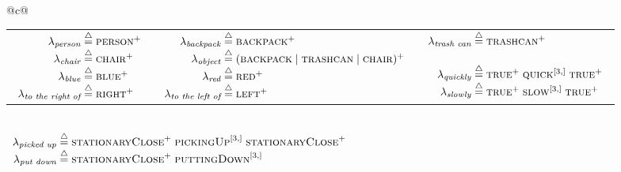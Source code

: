 \begin{table}
{\begin{tabular}{@{}c@{}}
\begin{tabular}{@{}c@{}c@{\hspace{-20ex}}c@{}}
\begin{math}
          \begin{array}[t]{r@{\;\define\;}l}
          \lambda_{\textit{person}} & \textsc{person}\plus\\
          \lambda_{\textit{chair}} & \textsc{chair}\plus\\
          \lambda_{\textit{blue}} & \textsc{blue}\plus\\
          \lambda_{\textit{to the right of}} & \textsc{right}\plus
          \end{array}
        \end{math}&
        \begin{math}
          \begin{array}[t]{r@{\;\define\;}l}
          \lambda_{\textit{backpack}} & \textsc{backpack}\plus\\
          \lambda_{\textit{object}} &
          (\textsc{backpack}\;|\;\textsc{trashcan}\;|\;\textsc{chair})
          \plus\\
          \lambda_{\textit{red}} & \textsc{red}\plus\\
          \lambda_{\textit{to the left of}} & \textsc{left}\plus
          \end{array}
        \end{math}&
        \begin{math}
          \begin{array}[t]{r@{\;}c@{\;}l}
          \lambda_{\textit{trash can}} & \define & \textsc{trashcan} \plus\\
          \\[0.5ex]             %
          \lambda_{\textit{quickly}} & \define &
          \textsc{true}\plus\;\textsc{quick}\dagr\;\textsc{true}\plus\\
          \lambda_{\textit{slowly}} & \define &
          \textsc{true}\plus\;\textsc{slow}\dagr\;\textsc{true}\plus
          \end{array}
        \end{math}
      \end{tabular}\\
      \begin{math}
        \begin{array}[t]{r@{\;\define\;}l}
          \lambda_{\textit{picked up}} &
          \textsc{stationaryClose}\plus\;
          \textsc{pickingUp}\dagr\;
          \textsc{stationaryClose}\plus\\
          \lambda_{\textit{put down}} &
          \textsc{stationaryClose}\plus\;
          \textsc{puttingDown}\dagr\;

\end{array}
\end{math}
\end{tabular}}
\end{table}
